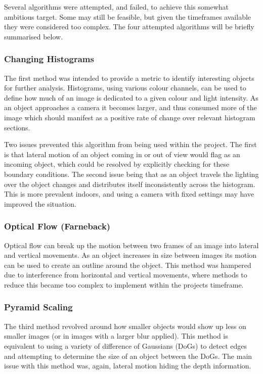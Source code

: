 \documentclass[conference]{IEEEtran}
\begin{document}
Several algorithms were attempted, and failed, to achieve this somewhat ambitious target. Some may still be feasible, but given the timeframes available they were considered too complex. The four attempted algorithms will be briefly summarised below.

\subsubsection{Changing Histograms}
The first method was intended to provide a metric to identify interesting objects for further analysis. Histograms, using various colour channels, can be used to define how much of an image is dedicated to a given colour and light intensity. As an object approaches a camera it becomes larger, and thus consumed more of the image which should manifest as a positive rate of change over relevant histogram sections.

Two issues prevented this algorithm from being used within the project. The first is that lateral motion of an object coming in or out of view would flag as an incoming object, which could be resolved by explicitly checking for these boundary conditions. The second issue being that as an object travels the lighting over the object changes and distributes itself inconsistently across the histogram. This is more prevalent indoors, and using a camera with fixed settings may have improved the situation.

\subsubsection{Optical Flow (Farneback)}
Optical flow can break up the motion between two frames of an image into lateral and vertical movements. As an object increases in size between images its motion can be used to create an outline around the object. This method was hampered due to interference from horizontal and vertical movements, where methods to reduce this became too complex to implement within the projects timeframe.

\subsubsection{Pyramid Scaling}
The third method revolved around how smaller objects would show up less on smaller images (or in images with a larger blur applied). This method is equivalent to using a variety of difference of Gaussians (DoGs) to detect edges and attempting to determine the size of an object between the DoGs. The main issue with this method was, again, lateral motion hiding the depth information.
\end{document}
